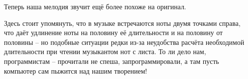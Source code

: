 \documentclass[../sparc.tex]{subfiles}
\begin{document}
Теперь наша мелодия звучит ещё более похоже на оригинал.

Здесь стоит упомянуть, что в музыке встречаются ноты двумя точками справа, что
даёт удлинение ноты на половину её длительности и на половину от половины -- но
подобные ситуации редки из-за неудобства расчёта необходимой длительности при
чтении музыкантом нот с листа. То ли дело нам, программистам -- прочитали не
спеша, запрограммировали, а там пусть компьютер сам пыжится над нашим творением!
\end{document}
